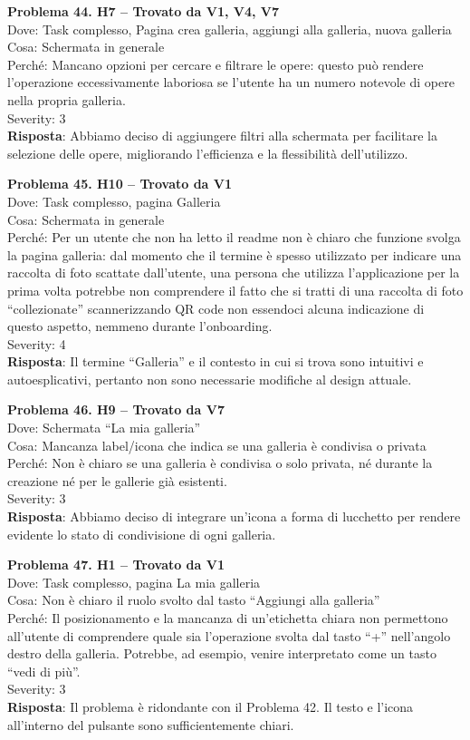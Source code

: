 \documentclass{article}
\begin{document}
\noindent \textbf{Problema 44. H7 – Trovato da V1, V4, V7} \\
Dove: Task complesso, Pagina crea galleria, aggiungi alla galleria, nuova galleria \\
Cosa: Schermata in generale \\
Perché: Mancano opzioni per cercare e filtrare le opere: questo può rendere l’operazione eccessivamente laboriosa se l’utente ha un numero notevole di opere nella propria galleria. \\
Severity: 3 \\
\textbf{Risposta}: Abbiamo deciso di aggiungere filtri alla schermata per facilitare la selezione delle opere, migliorando l’efficienza e la flessibilità dell’utilizzo.

\noindent \textbf{Problema 45. H10 – Trovato da V1} \\
Dove: Task complesso, pagina Galleria \\
Cosa: Schermata in generale \\
Perché: Per un utente che non ha letto il readme non è chiaro che funzione svolga la pagina galleria: dal momento che il termine è spesso utilizzato per indicare una raccolta di foto scattate dall’utente, una persona che utilizza l’applicazione per la prima volta potrebbe non comprendere il fatto che si tratti di una raccolta di foto “collezionate” scannerizzando QR code non essendoci alcuna indicazione di questo aspetto, nemmeno durante l’onboarding. \\
Severity: 4 \\
\textbf{Risposta}: Il termine “Galleria” e il contesto in cui si trova sono intuitivi e autoesplicativi, pertanto non sono necessarie modifiche al design attuale.

\noindent \textbf{Problema 46. H9 – Trovato da V7} \\
Dove: Schermata “La mia galleria” \\
Cosa: Mancanza label/icona che indica se una galleria è condivisa o privata \\
Perché: Non è chiaro se una galleria è condivisa o solo privata, né durante la creazione né per le gallerie già esistenti. \\
Severity: 3 \\
\textbf{Risposta}: Abbiamo deciso di integrare un’icona a forma di lucchetto per rendere evidente lo stato di condivisione di ogni galleria.

\noindent \textbf{Problema 47. H1 – Trovato da V1} \\
Dove: Task complesso, pagina La mia galleria \\
Cosa: Non è chiaro il ruolo svolto dal tasto “Aggiungi alla galleria” \\
Perché: Il posizionamento e la mancanza di un’etichetta chiara non permettono all’utente di comprendere quale sia l’operazione svolta dal tasto “+” nell’angolo destro della galleria. Potrebbe, ad esempio, venire interpretato come un tasto “vedi di più”. \\
Severity: 3 \\
\textbf{Risposta}: Il problema è ridondante con il Problema 42. Il testo e l’icona all’interno del pulsante sono sufficientemente chiari.
\end{document}
